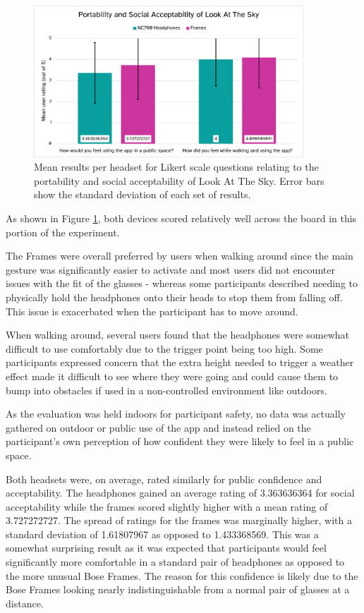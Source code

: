 \documentclass{l4proj}
\begin{document}
\begin{figure}[htb!]
    \centering
    \includegraphics[width=0.9\textwidth]{images/graphs/Social acceptability graph.png}
    \caption{Mean results per headset for Likert scale questions relating to the portability and social acceptability of Look At The Sky. Error bars show the standard deviation of each set of results.}
    \label{fig:social_acceptability}
\end{figure}

As shown in Figure \ref{fig:social_acceptability}, both devices scored relatively well across the board in this portion of the experiment.

The Frames were overall preferred by users when walking around since the main gesture was significantly easier to activate and most users did not encounter issues with the fit of the glasses - whereas some participants described needing to physically hold the headphones onto their heads to stop them from falling off. This issue is exacerbated when the participant has to move around.

When walking around, several users found that the headphones were somewhat difficult to use comfortably due to the trigger point being too high. Some participants expressed concern that the extra height needed to trigger a weather effect made it difficult to see where they were going and could cause them to bump into obstacles if used in a non-controlled environment like outdoors.

As the evaluation was held indoors for participant safety, no data was actually gathered on outdoor or public use of the app and instead relied on the participant's own perception of how confident they were likely to feel in a public space.

Both headsets were, on average, rated similarly for public confidence and acceptability. The headphones gained an average rating of \num{3.363636364
} for social acceptability while the frames scored slightly higher with a mean rating of \num{3.727272727}. The spread of ratings for the frames was marginally higher, with a standard deviation of \num{1.61807967} as opposed to \num{1.433368569}.
This was a somewhat surprising result as it was expected that participants would feel significantly more comfortable in a standard pair of headphones as opposed to the more unusual Bose Frames. The reason for this confidence is likely due to the Bose Frames looking nearly indistinguishable from a normal pair of glasses at a distance.
 
\end{document}
